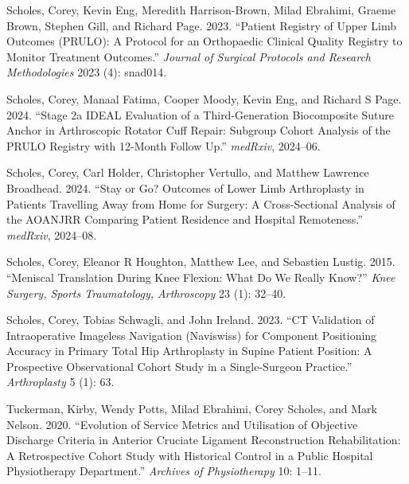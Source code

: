 \documentclass[
  letterpaper,
  DIV=11,
  numbers=noendperiod]{scrartcl}
\newlength{\cslhangindent}
\newenvironment{CSLReferences}[2] %
 {\begin{list}{}{%
  \setlength{\itemindent}{0pt}
  \setlength{\leftmargin}{0pt}
  \setlength{\parsep}{0pt}
  \ifodd #1
   \setlength{\leftmargin}{\cslhangindent}
   \setlength{\itemindent}{-1\cslhangindent}
  \fi
  \setlength{\itemsep}{#2\baselineskip}}}
 {\end{list}}
\begin{document}
\begin{CSLReferences}{1}{0}
Scholes, Corey, Kevin Eng, Meredith Harrison-Brown, Milad Ebrahimi,
Graeme Brown, Stephen Gill, and Richard Page. 2023. {``Patient Registry
of Upper Limb Outcomes (PRULO): A Protocol for an Orthopaedic Clinical
Quality Registry to Monitor Treatment Outcomes.''} \emph{Journal of
Surgical Protocols and Research Methodologies} 2023 (4): snad014.

Scholes, Corey, Manaal Fatima, Cooper Moody, Kevin Eng, and Richard S
Page. 2024. {``Stage 2a IDEAL Evaluation of a Third-Generation
Biocomposite Suture Anchor in Arthroscopic Rotator Cuff Repair: Subgroup
Cohort Analysis of the PRULO Registry with 12-Month Follow Up.''}
\emph{medRxiv}, 2024--06.

Scholes, Corey, Carl Holder, Christopher Vertullo, and Matthew Lawrence
Broadhead. 2024. {``Stay or Go? Outcomes of Lower Limb Arthroplasty in
Patients Travelling Away from Home for Surgery: A Cross-Sectional
Analysis of the AOANJRR Comparing Patient Residence and Hospital
Remoteness.''} \emph{medRxiv}, 2024--08.

Scholes, Corey, Eleanor R Houghton, Matthew Lee, and Sebastien Lustig.
2015. {``Meniscal Translation During Knee Flexion: What Do We Really
Know?''} \emph{Knee Surgery, Sports Traumatology, Arthroscopy} 23 (1):
32--40.

Scholes, Corey, Tobias Schwagli, and John Ireland. 2023. {``CT
Validation of Intraoperative Imageless Navigation (Naviswiss) for
Component Positioning Accuracy in Primary Total Hip Arthroplasty in
Supine Patient Position: A Prospective Observational Cohort Study in a
Single-Surgeon Practice.''} \emph{Arthroplasty} 5 (1): 63.

Tuckerman, Kirby, Wendy Potts, Milad Ebrahimi, Corey Scholes, and Mark
Nelson. 2020. {``Evolution of Service Metrics and Utilisation of
Objective Discharge Criteria in Anterior Cruciate Ligament
Reconstruction Rehabilitation: A Retrospective Cohort Study with
Historical Control in a Public Hospital Physiotherapy Department.''}
\emph{Archives of Physiotherapy} 10: 1--11.

\end{CSLReferences}
\end{document}
